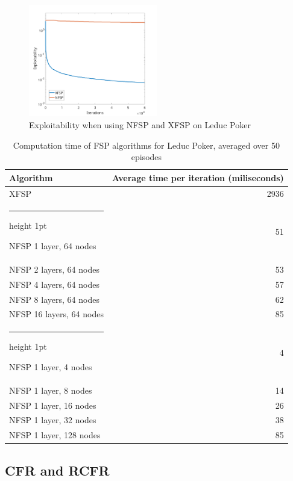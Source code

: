 \documentclass[10pt,a4paper]{article}
\makeatletter
\newcommand{\thickhline}{%
    \noalign {\ifnum 0=`}\fi \hrule height 1pt
    \futurelet \reserved@a \@xhline
}
\makeatother
\begin{document}
\begin{center}
	\begin{figure}[h]
	\centering
	\label{fig:layers_kuhn}
	\includegraphics[width=0.5\textwidth]{Figures/xfsp_nfsp_leduc.png}
	\caption{Exploitability when using NFSP and XFSP on Leduc Poker}
	\end{figure}
	\end{center}

\begin{table}[h]
\begin{center}
\begin{tabular}{|l|r|}
\hline 
Algorithm & Average time per iteration (miliseconds) \\\hline 
XFSP & 2936 \\ 
\thickhline 
NFSP 1 layer, 64 nodes & 51 \\ 
\hline 
NFSP 2 layers, 64 nodes  & 53 \\ 
\hline 
NFSP 4 layers, 64 nodes & 57 \\ 
\hline 
NFSP 8 layers, 64 nodes & 62 \\ 
\hline 
NFSP 16 layers, 64 nodes & 85 \\ 
\thickhline
NFSP 1 layer, 4 nodes & 4 \\ 
\hline 
NFSP 1 layer, 8 nodes & 14 \\ 
\hline 
NFSP 1 layer, 16 nodes & 26 \\ 
\hline 
NFSP 1 layer, 32 nodes & 38 \\ 
\hline 
NFSP 1 layer, 128 nodes & 85 \\ 
\hline 
\end{tabular}
\caption{Computation time of FSP algorithms for Leduc Poker, averaged over 50 episodes}
\label{tab:fsp_leduc}
\end{center}
\end{table} 

\FloatBarrier
\subsection{CFR and RCFR}
\end{document}
